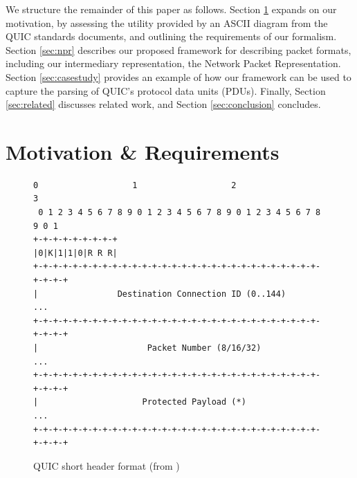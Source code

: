 \documentclass[10pt,sigconf]{acmart}
\begin{document}
We structure the remainder of this paper as follows. Section \ref{sec:motivation} expands
on our motivation, by assessing the utility provided by an ASCII diagram from the QUIC
standards documents, and outlining the requirements of our formalism. Section
\ref{sec:npr} describes our proposed framework for describing packet formats,
including our intermediary representation, the Network Packet Representation. Section
\ref{sec:casestudy} provides an example of how our framework can be used to capture
the parsing of QUIC's protocol data units (PDUs). Finally, Section \ref{sec:related} discusses
related work, and Section \ref{sec:conclusion} concludes.

%
%
\section{Motivation \& Requirements}
\label{sec:motivation}

\begin{figure}
	\centering
	\vspace{3mm}
    \begin{BVerbatim}[fontsize=\scriptsize]
 0                   1                   2                   3
 0 1 2 3 4 5 6 7 8 9 0 1 2 3 4 5 6 7 8 9 0 1 2 3 4 5 6 7 8 9 0 1
+-+-+-+-+-+-+-+-+
|0|K|1|1|0|R R R|
+-+-+-+-+-+-+-+-+-+-+-+-+-+-+-+-+-+-+-+-+-+-+-+-+-+-+-+-+-+-+-+-+
|                Destination Connection ID (0..144)           ...
+-+-+-+-+-+-+-+-+-+-+-+-+-+-+-+-+-+-+-+-+-+-+-+-+-+-+-+-+-+-+-+-+
|                      Packet Number (8/16/32)                ...
+-+-+-+-+-+-+-+-+-+-+-+-+-+-+-+-+-+-+-+-+-+-+-+-+-+-+-+-+-+-+-+-+
|                     Protected Payload (*)                   ...
+-+-+-+-+-+-+-+-+-+-+-+-+-+-+-+-+-+-+-+-+-+-+-+-+-+-+-+-+-+-+-+-+
    \end{BVerbatim}
    \caption{QUIC short header format (from \cite{draft-ietf-quic-transport-latest})}
    \label{fig:quic-short-hdr}
\end{figure}
\end{document}
